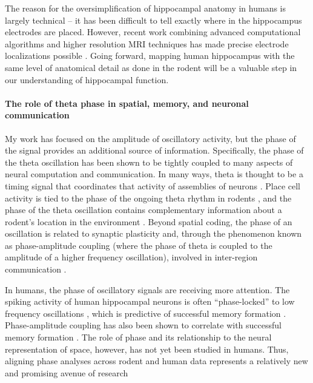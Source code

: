 The reason for the oversimplification of hippocampal anatomy in humans is largely technical -- it has been difficult to tell exactly where in the hippocampus electrodes are placed. However, recent work combining advanced computational algorithms and higher resolution MRI techniques has made precise electrode localizations possible \citep{YushEtal15,DyksEtal12}. Going forward, mapping human hippocampus with the same level of anatomical detail as done in the rodent will be a valuable step in our understanding of hippocampal function.



\paragraph{The role of theta phase in spatial, memory, and neuronal communication}
My work has focused on the amplitude of oscillatory activity, but the phase of the signal provides an additional source of information. Specifically, the phase of the theta oscillation has been shown to be tightly coupled to many aspects of neural computation and communication. In many ways, theta is thought to be a timing signal that coordinates that activity of assemblies of neurons \citep{Buzs05}. Place cell activity is tied to the phase of the ongoing theta rhythm in rodents \citep{OKeeRecc93,SkagEtal96}, and the phase of the theta oscillation contains complementary information about a rodent's location in the environment \citep{AgarEtal14}. Beyond spatial coding, the phase of an oscillation is related to synaptic plasticity \citep{BuzsDrag04,HuerLism93} and, through the phenomenon known as phase-amplitude coupling (where the phase of theta is coupled to the amplitude of a higher frequency oscillation), involved in inter-region communication \citep{ColgEtal09}.

In humans, the phase of oscillatory signals are receiving more attention. The spiking activity of human hippocampal neurons is often ``phase-locked'' to low frequency oscillations \citep{JacoEtal07}, which is predictive of successful memory formation \citep{RutiEtal10}. Phase-amplitude coupling has also been shown to correlate with successful memory formation \citep{CanoEtal06,LegaEtal14}. The role of phase and its relationship to the neural representation of space, however, has not yet been studied in humans. Thus, aligning phase analyses across rodent and human data represents a relatively new and promising avenue of research













